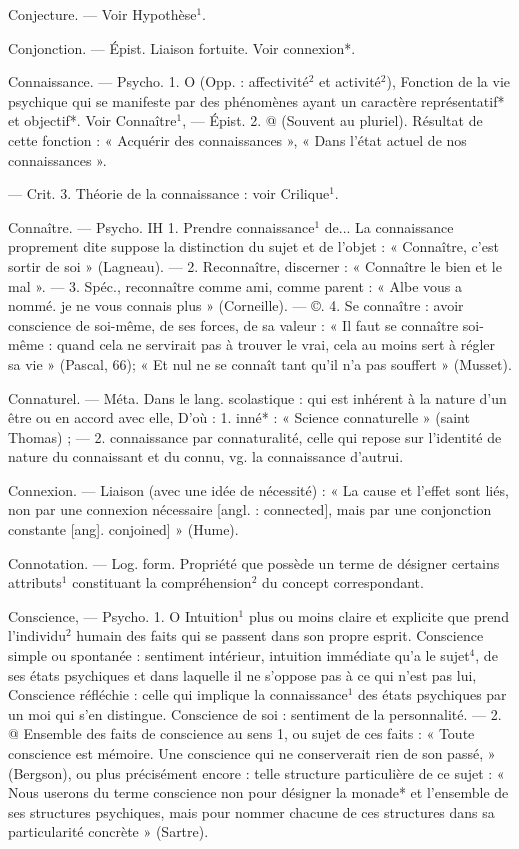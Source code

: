 Conjecture. — Voir Hypothèse$^1$.

Conjonction. — Épist. Liaison fortuite. Voir connexion*.

Connaissance. — Psycho. 1. O (Opp. :
affectivité$^2$ et activité$^2$), Fonction de
la vie psychique qui se manifeste
par des phénomènes ayant un caractère représentatif* et objectif*. Voir
Connaître$^1$, — Épist. 2. @ (Souvent
au pluriel). Résultat de cette fonction : « Acquérir des connaissances »,
« Dans l’état actuel de nos connaissances ».

— Crit. 3. Théorie de la connaissance : voir Crilique$^1$.

Connaître. — Psycho. IH 1. Prendre
connaissance$^1$ de... La connaissance
proprement dite suppose la distinction du sujet et de l’objet : « Connaître, c’est sortir de soi » (Lagneau).
— 2. Reconnaître, discerner :
« Connaître le bien et le mal ». —
3. Spéc., reconnaître comme ami,
comme parent : « Albe vous a nommé.
je ne vous connais plus » (Corneille).
— ©. 4. Se connaître : avoir conscience de soi-même, de ses forces,
de sa valeur : « Il faut se connaître
soi-même : quand cela ne servirait
pas à trouver le vrai, cela au moins
sert à régler sa vie » (Pascal, 66); « Et
nul ne se connaît tant qu'il n’a pas
souffert » (Musset).

Connaturel. — Méta. Dans le lang.
scolastique : qui est inhérent à la
nature d’un être ou en accord avec
elle, D'où : 1. inné* : « Science connaturelle » (saint Thomas) ; — 2. connaissance par connaturalité, celle
qui repose sur l’identité de nature
du connaissant et du connu, vg. la
connaissance d'autrui.

Connexion. — Liaison (avec une idée
de nécessité) : « La cause et l'effet
sont liés, non par une connexion
nécessaire [angl. : connected], mais
par une conjonction constante [ang].
conjoined] » (Hume).

Connotation. — Log. form. Propriété
que possède un terme de désigner
certains attributs$^1$ constituant la
compréhension$^2$ du concept correspondant.

Conscience, — Psycho. 1. O Intuition$^1$
plus ou moins claire et explicite
que prend l'individu$^2$ humain des
faits qui se passent dans son propre
esprit. Conscience simple ou spontanée : sentiment intérieur, intuition
immédiate qu’a le sujet$^4$, de ses
états psychiques et dans laquelle il
ne s'oppose pas à ce qui n’est pas lui,
Conscience réfléchie : celle qui implique
la connaissance$^1$ des états psychiques par un moi qui s’en distingue. Conscience de soi : sentiment
de la personnalité. — 2. @ Ensemble
des faits de conscience au sens 1, ou
sujet de ces faits : « Toute conscience
est mémoire. Une conscience qui ne
conserverait rien de son passé, »
(Bergson), ou plus précisément encore : telle structure particulière de
ce sujet : « Nous userons du terme
conscience non pour désigner la monade* et l’ensemble de ses structures
psychiques, mais pour nommer chacune de ces structures dans sa particularité concrète » (Sartre).

